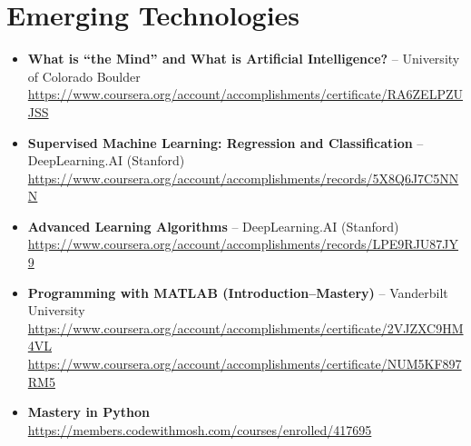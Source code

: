 \documentclass[11pt,a4paper]{article}
\begin{document}
\section{Emerging Technologies}
\begin{itemize}
    \item \textbf{What is “the Mind” and What is Artificial Intelligence?} – University of Colorado Boulder\\
    \url{https://www.coursera.org/account/accomplishments/certificate/RA6ZELPZUJSS}

    \item \textbf{Supervised Machine Learning: Regression and Classification} – DeepLearning.AI (Stanford)\\
    \url{https://www.coursera.org/account/accomplishments/records/5X8Q6J7C5NNN}

    \item \textbf{Advanced Learning Algorithms} – DeepLearning.AI (Stanford)\\
    \url{https://www.coursera.org/account/accomplishments/records/LPE9RJU87JY9}

    \item \textbf{Programming with MATLAB (Introduction–Mastery)} – Vanderbilt University\\
    \url{https://www.coursera.org/account/accomplishments/certificate/2VJZXC9HM4VL}\\
    \url{https://www.coursera.org/account/accomplishments/certificate/NUM5KF897RM5}

    \item \textbf{Mastery in Python}\\
    \url{https://members.codewithmosh.com/courses/enrolled/417695}
\end{itemize}
\end{document}
